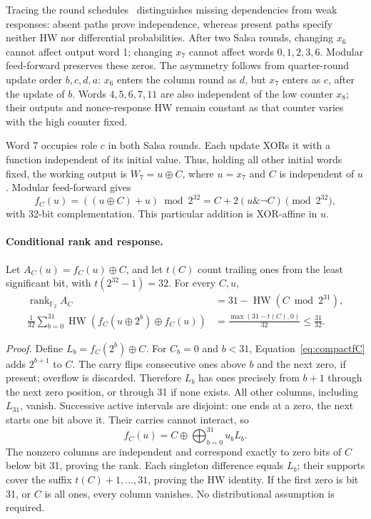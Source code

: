\documentclass[electronics,article,submit,pdftex,oneauthor]{Definitions/mdpi}
\begin{document}

Tracing the round schedules~\citep{nir2018,bernstein2008salsa} distinguishes missing dependencies from weak responses: absent paths prove independence, whereas present paths specify neither HW nor differential probabilities. After two Salsa rounds, changing $x_6$ cannot affect output word 1; changing $x_7$ cannot affect words $0,1,2,3,6$. Modular feed-forward preserves these zeros. The asymmetry follows from quarter-round update order $b,c,d,a$: $x_6$ enters the column round as $d$, but $x_7$ enters as $c$, after the update of $b$. Words $4,5,6,7,11$ are also independent of the low counter $x_8$; their outputs and nonce-response HW remain constant as that counter varies with the high counter fixed.

Word 7 occupies role $c$ in both Salsa rounds. Each update XORs it with a function independent of its initial value. Thus, holding all other initial words fixed, the working output is $W_7=u\oplus C$, where $u=x_7$ and $C$ is independent of $u$. Modular feed-forward gives
\begin{equation}
 f_C(u)=((u\oplus C)+u)\bmod2^{32}
       =C+2(u\mathbin{\&}\neg C)\pmod{2^{32}},
 \label{eq:compactfC}
\end{equation}
with 32-bit complementation. This particular addition is XOR-affine in $u$.

\paragraph{Conditional rank and response.}
Let $A_C(u)=f_C(u)\oplus C$, and let $t(C)$ count trailing ones from the least significant bit, with $t(2^{32}-1)=32$. For every $C,u$,
\begin{equation}
\begin{aligned}
 \operatorname{rank}_{\mathbb F_2}A_C
   &=31-\operatorname{HW}(C\bmod2^{31}),\\
 \frac1{32}\sum_{b=0}^{31}\operatorname{HW}\!\left(f_C(u\oplus2^b)\oplus f_C(u)\right)
   &=\frac{\max(31-t(C),0)}{32}\leq\frac{31}{32}.
\end{aligned}
\label{eq:affinecorollary}
\end{equation}

\emph{Proof.} Define $L_b=f_C(2^b)\oplus C$. For $C_b=0$ and $b<31$, Equation~\eqref{eq:compactfC} adds $2^{b+1}$ to $C$. The carry flips consecutive ones above $b$ and the next zero, if present; overflow is discarded. Therefore $L_b$ has ones precisely from $b+1$ through the next zero position, or through 31 if none exists. All other columns, including $L_{31}$, vanish. Successive active intervals are disjoint: one ends at a zero, the next starts one bit above it. Their carries cannot interact, so
\[
 f_C(u)=C\oplus\bigoplus_{b=0}^{31}u_bL_b.
\]
The nonzero columns are independent and correspond exactly to zero bits of $C$ below bit 31, proving the rank. Each singleton difference equals $L_b$; their supports cover the suffix $t(C)+1,\ldots,31$, proving the HW identity. If the first zero is bit 31, or $C$ is all ones, every column vanishes. No distributional assumption is required.
\end{document}
